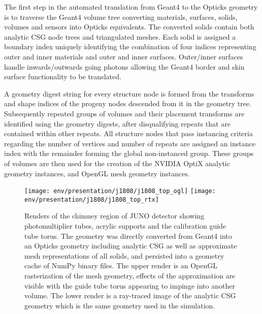 \documentclass{webofc}
\newcommand{\comment}[1]{}
\begin{document}
The first step in the automated translation from Geant4 to the Opticks geometry is to traverse the Geant4 volume tree converting 
materials, surfaces, solids, volumes and sensors into Opticks equivalents. 
The converted solids contain both analytic CSG node trees and triangulated meshes.   
Each solid is assigned a boundary index uniquely identifying the combination of four indices representing 
outer and inner materials and outer and inner surfaces. Outer/inner surfaces handle inwards/outwards going photons allowing the Geant4 border and skin
surface functionality to be translated. 

A geometry digest string for every structure node is formed from the transforms and shape indices of the progeny nodes descended from it in the geometry tree. 
Subsequently repeated groups of volumes and their placement transforms are identified using the geometry digests, after disqualifying repeats
that are contained within other repeats. 
All structure nodes that pass instancing criteria regarding the number of vertices and number of repeats are assigned an instance index
with the remainder forming the global non-instanced group. 
These groups of volumes are then used for the creation of the NVIDIA OptiX analytic geometry instances, and OpenGL mesh geometry instances.  

\comment{
GPUs contain hardware dedicated to fast texture lookup and interpolation.
This is exploited by using a single 2D {\tt float4} texture named the boundary texture
that contains interleaved material and surface properties as a function of wavelength for all
unique boundaries.
The boundary index returned from a ray traced primitive intersection together with
an orientation offset identified from the angle between the geometric normal and ray direction
enables four wavelength interpolated material or surface properties to be
obtained from a single hardware optimized texture lookup.
}
%
%
\begin{figure}
\centering
\texttt{[image: env/presentation/j1808/j1808\_top\_ogl]}
\texttt{[image: env/presentation/j1808/j1808\_top\_rtx]}
\caption{Renders of the chimney region of JUNO detector showing photomultiplier tubes, acrylic supports and the calibration guide tube torus. 
The geometry was directly converted from Geant4 into an Opticks geometry including analytic CSG as well as approximate mesh representations of all solids, 
and persisted into a geometry cache of NumPy\cite{numpy} binary files. 
The upper render is an OpenGL rasterization of the mesh geometry, effects of the approximation are visible with the guide tube torus appearing to impinge into
another volume. The lower render is a ray-traced image of the analytic CSG geometry which is the 
same geometry used in the simulation.}
\label{j1808} 
\end{figure}
%
%
\end{document}
